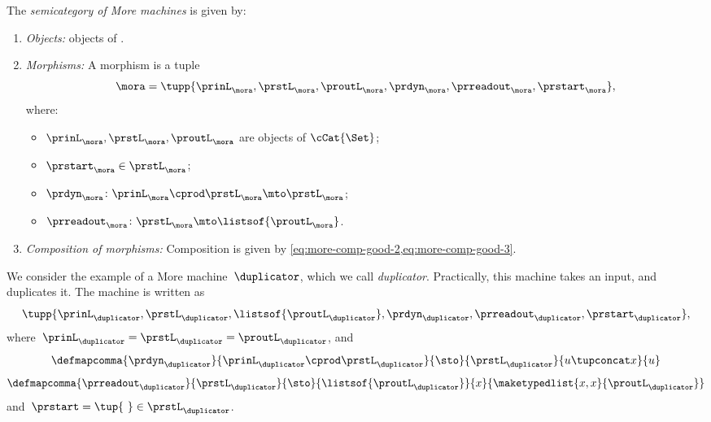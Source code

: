 \begin{definition}[\More]
    \label{def:More}
    The \emph{semicategory of More machines} \More is given by:
    \begin{enumerate}
        \item \emph{Objects:} objects of \cCat{\Set}.
        \item \emph{Morphisms:}
              A morphism is a tuple
              \begin{equation}
                  \mora = \tupp{\prinL_{\mora},\prstL_{\mora}, \proutL_{\mora},\prdyn_{\mora},\prreadout_{\mora},\prstart_{\mora}},
              \end{equation}
              where:
              \begin{itemize}
                  \item $\prinL_{\mora},\prstL_{\mora}, \proutL_{\mora}$ are objects of $\cCat{\Set}$;
                  \item $\prstart_{\mora} \in \prstL_{\mora}$;
                  \item $ \prdyn_{\mora} \colon \prinL_{\mora} \cprod \prstL_{\mora} \mto \prstL_{\mora}$;
                  \item $ \prreadout_{\mora} \colon \prstL_{\mora}  \mto \listsof{\proutL_{\mora}}$.
              \end{itemize}
        \item \emph{Composition of morphisms:}
              Composition is given by \cref{eq:more-comp-good-2,eq:more-comp-good-3}.
    \end{enumerate}
\end{definition}


\begin{example}[Duplicator]
    We consider the example of a More machine~$\duplicator$, which we call \emph{duplicator}.
    Practically, this machine takes an input, and duplicates it.
    The machine is written as
    \begin{equation*}
        \tupp{\prinL_{\duplicator},\prstL_{\duplicator},\listsof{\proutL_{\duplicator}},\prdyn_{\duplicator},\prreadout_{\duplicator},\prstart_{\duplicator}},
    \end{equation*}
    where~$\prinL_{\duplicator}=\prstL_{\duplicator}=\proutL_\duplicator$, and
    \begin{equation*}
        \defmapcomma{\prdyn_\duplicator}
        { \prinL_\duplicator \cprod \prstL_\duplicator}
        {\sto}
        {\prstL_\duplicator}
        {u \tupconcat x}
        {u}
    \end{equation*}
    \begin{equation*}
        \defmapcomma{\prreadout_\duplicator}
        {\prstL_\duplicator}
        {\sto}
        {\listsof{\proutL_\duplicator}}
        {x}
       {\maketypedlist{x,x}{\proutL_\duplicator}}
    \end{equation*}
    and~$\prstart=\tup{ \ } \in \prstL_\duplicator$.
\end{example}

